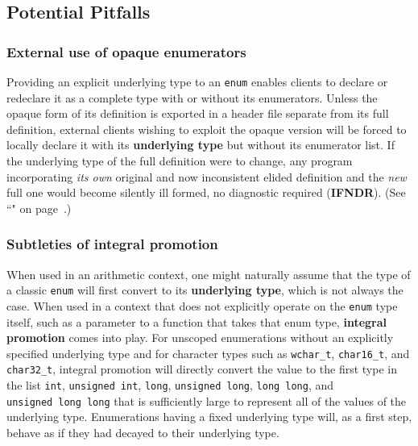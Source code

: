 \subsection[Potential Pitfalls]{Potential Pitfalls}\label{potential-pitfalls-underlyingenum}

\subsubsection[External use of opaque enumerators]{External use of opaque enumerators}\label{external-use-of-opaque-enumerators-enumunderlying}

Providing an explicit underlying type to an \texttt{enum} enables
clients to declare or redeclare it as a complete type with or without
its enumerators. Unless the opaque form of its definition is exported in
a header file separate from its full definition, external clients
wishing to exploit the opaque version will be forced to locally declare
it with its \textbf{underlying type} but without its enumerator list. If
the underlying type of the full definition were to change, any program
incorporating \emph{its own} original and now inconsistent elided
definition and the \emph{new} full one would become silently ill formed, no diagnostic required (\textbf{IFNDR}). (See ``" on page~\pageref{enumopaque}.)

\subsubsection[Subtleties of integral promotion]{Subtleties of integral promotion}\label{subtleties-of-integral-promotion}

When used in an arithmetic context, one might naturally assume that the
type of a classic \texttt{enum} will first convert to its
\textbf{underlying type}, which is not always the case. When used in a
context that does not explicitly operate on the \texttt{enum} type
itself, such as a parameter to a function that takes that enum type,
\textbf{integral promotion} comes into play. For unscoped enumerations
without an explicitly specified underlying type and for character types
such as \texttt{wchar\_t}, \texttt{char16\_t}, and \texttt{char32\_t},
integral promotion will directly convert the value to the first type in
the list \texttt{int}, \texttt{unsigned}~\texttt{int}, \texttt{long},
\texttt{unsigned}~\texttt{long}, \texttt{long}~\texttt{long}, and
\texttt{unsigned}~\texttt{long}~\texttt{long} that is sufficiently large
to represent all of the values of the underlying type. Enumerations
having a fixed underlying type will, as a first step, behave as if they
had decayed to their underlying type.


